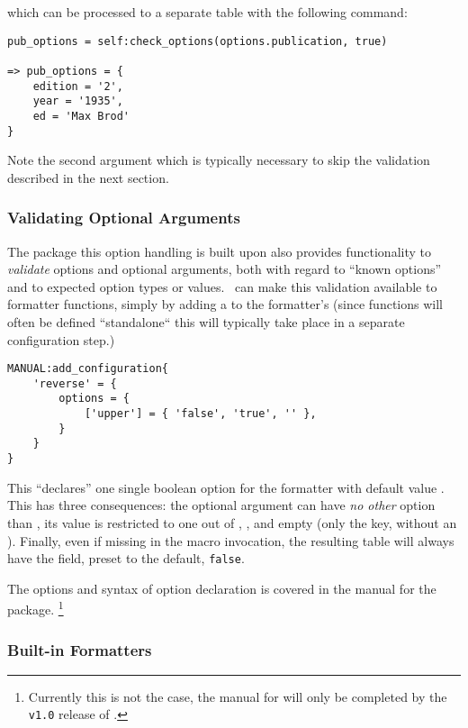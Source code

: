 \documentclass[12pt]{scrartcl}
\begin{document}
\noindent which can be processed to a separate table with the following command:

\begin{verbatim}
pub_options = self:check_options(options.publication, true)

=> pub_options = {
	edition = '2',
	year = '1935',
	ed = 'Max Brod'
}
\end{verbatim}

\noindent Note the second argument  which is typically necessary to
skip the validation described in the next section.


\subsubsection{Validating Optional Arguments}
\label{sec:defining:validating-optional-arguments}

The  package this option handling is built upon also
provides functionality to \emph{validate} options and optional arguments, both
with regard to “known options” and to expected option types or values.
\luaformatters\ can make this validation available to formatter
functions, simply by adding a  to the formatter's
 (since functions will often be defined “standalone“ this will typically take place in a separate configuration step.)

\begin{verbatim}
MANUAL:add_configuration{
	'reverse' = {
		options = {
			['upper'] = { 'false', 'true', '' },
		}
	}
}
\end{verbatim}

\noindent This “declares” one single boolean option for the 
formatter with default value .  This has three consequences: the
optional argument can have \emph{no other} option than , its value
is restricted to one out of , , and empty (only the
key, without an \luavar{=}). Finally, even if missing in the macro invocation,
the resulting  table will always have the  field,
preset to the default, \texttt{false}.

The options and syntax of option declaration is covered in the manual for the
 package.%
\footnote{ Currently this is not the case, the manual for
 will only be completed by the \texttt{v1.0} release of
\luaformatters.}

\subsubsection{Built-in Formatters}
\label{sec:defining:builtin-formatters}
\end{document}
